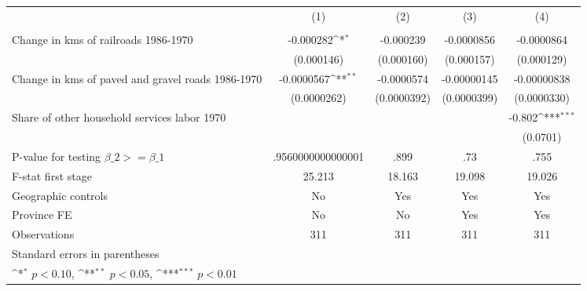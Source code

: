 {
\def\sym#1{\ifmmode^{#1}\else\(^{#1}\)\fi}
\begin{tabular}{l*{4}{c}}
\hline\hline
                &\multicolumn{1}{c}{(1)}&\multicolumn{1}{c}{(2)}&\multicolumn{1}{c}{(3)}&\multicolumn{1}{c}{(4)}\\
                &\multicolumn{1}{c}{}&\multicolumn{1}{c}{}&\multicolumn{1}{c}{}&\multicolumn{1}{c}{}\\
\hline
Change in kms of railroads 1986-1970&-0.000282\sym{*}  &-0.000239         &-0.0000856         &-0.0000864         \\
                &(0.000146)         &(0.000160)         &(0.000157)         &(0.000129)         \\
[1em]
Change in kms of paved and gravel roads 1986-1970&-0.0000567\sym{**} &-0.0000574         &-0.00000145         &-0.00000838         \\
                &(0.0000262)         &(0.0000392)         &(0.0000399)         &(0.0000330)         \\
[1em]
Share of other household services labor 1970&                  &                  &                  &   -0.802\sym{***}\\
                &                  &                  &                  & (0.0701)         \\
\hline
P-value for testing $\beta\_{2} >= \beta\_{1}$&.9560000000000001         &     .899         &      .73         &     .755         \\
F-stat first stage&   25.213         &   18.163         &   19.098         &   19.026         \\
Geographic controls&       No         &      Yes         &      Yes         &      Yes         \\
Province FE     &       No         &       No         &      Yes         &      Yes         \\
Observations    &      311         &      311         &      311         &      311         \\
\hline\hline
\multicolumn{5}{l}{\footnotesize Standard errors in parentheses}\\
\multicolumn{5}{l}{\footnotesize \sym{*} \(p<0.10\), \sym{**} \(p<0.05\), \sym{***} \(p<0.01\)}\\
\end{tabular}
}
